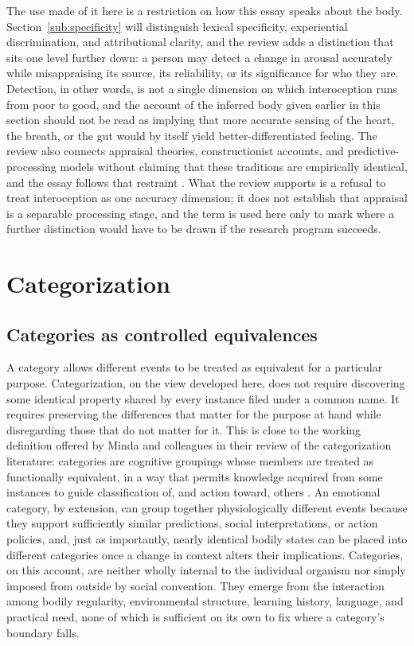\documentclass[11pt]{article}
\begin{document}
The use made of it here is a restriction on how this essay speaks about the body. Section~\ref{sub:specificity} will distinguish lexical specificity, experiential discrimination, and attributional clarity, and the review adds a distinction that sits one level further down: a person may detect a change in arousal accurately while misappraising its source, its reliability, or its significance for who they are. Detection, in other words, is not a single dimension on which interoception runs from poor to good, and the account of the inferred body given earlier in this section should not be read as implying that more accurate sensing of the heart, the breath, or the gut would by itself yield better-differentiated feeling. The review also connects appraisal theories, constructionist accounts, and predictive-processing models without claiming that these traditions are empirically identical, and the essay follows that restraint \citep{DelPopolo2026}. What the review supports is a refusal to treat interoception as one accuracy dimension; it does not establish that appraisal is a separable processing stage, and the term is used here only to mark where a further distinction would have to be drawn if the research program succeeds.

\section{Categorization}\label{sec:categorization}

\subsection{Categories as controlled equivalences}

A category allows different events to be treated as equivalent for a particular purpose. Categorization, on the view developed here, does not require discovering some identical property shared by every instance filed under a common name. It requires preserving the differences that matter for the purpose at hand while disregarding those that do not matter for it. This is close to the working definition offered by Minda and colleagues in their review of the categorization literature: categories are cognitive groupings whose members are treated as functionally equivalent, in a way that permits knowledge acquired from some instances to guide classification of, and action toward, others \citep{Minda2024}. An emotional category, by extension, can group together physiologically different events because they support sufficiently similar predictions, social interpretations, or action policies, and, just as importantly, nearly identical bodily states can be placed into different categories once a change in context alters their implications. Categories, on this account, are neither wholly internal to the individual organism nor simply imposed from outside by social convention. They emerge from the interaction among bodily regularity, environmental structure, learning history, language, and practical need, none of which is sufficient on its own to fix where a category's boundary falls.
\end{document}
